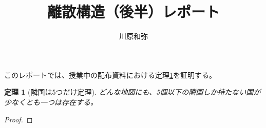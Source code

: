\documentclass{jsarticle}
\newtheorem{thm}{定理}
\begin{document}
\title{離散構造（後半）レポート}
\author{川原和弥}
\maketitle

このレポートでは、授業中の配布資料における定理\ref{ringoku}を証明する。

\begin{thm}[隣国は5つだけ定理]
    \label{ringoku}
    どんな地図にも、5個以下の隣国しか持たない国が少なくとも一つは存在する。
\end{thm}

\begin{proof}
    
\end{proof}
\end{document}
